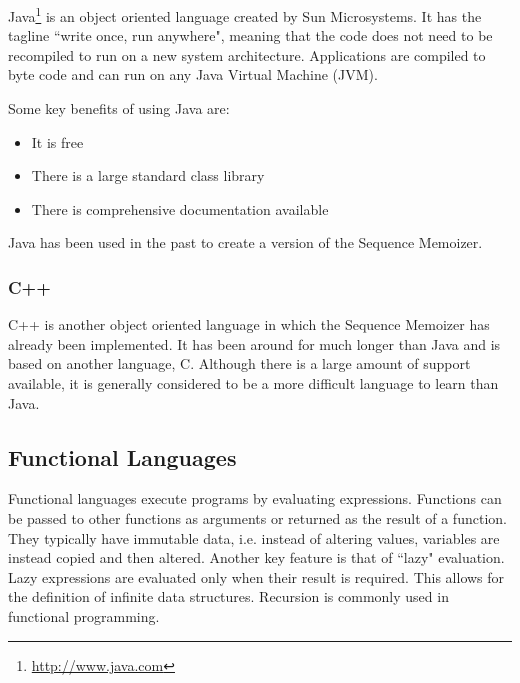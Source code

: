 Java\footnote{\url{http://www.java.com}} is an object oriented language created by Sun Microsystems. It has the tagline ``write once, run anywhere", meaning that the code does not need to be recompiled to run on a new system architecture. Applications are compiled to byte code and can run on any Java Virtual Machine (JVM).

Some key benefits of using Java are:

\begin{itemize}

\item It is free
\item There is a large standard class library
\item There is comprehensive documentation available 

\end{itemize}

\noindent Java has been used in the past to create a version of the Sequence Memoizer. 




\subsubsection{C++}

C++ is another object oriented language in which the Sequence Memoizer has already been implemented. It has been around for much longer than Java and is based on another language, C. Although there is a large amount of support available, it is generally considered to be a more difficult language to learn than Java.



\subsection{Functional Languages}

Functional languages execute programs by evaluating expressions. Functions can be passed to other functions as arguments or returned as the result of a function. They typically have immutable data, i.e. instead of altering values, variables are instead copied and then altered. Another key feature is that of ``lazy" evaluation. Lazy expressions are evaluated only when their result is required. This allows for the definition of infinite data structures. Recursion is commonly used in functional programming. 

%
%

